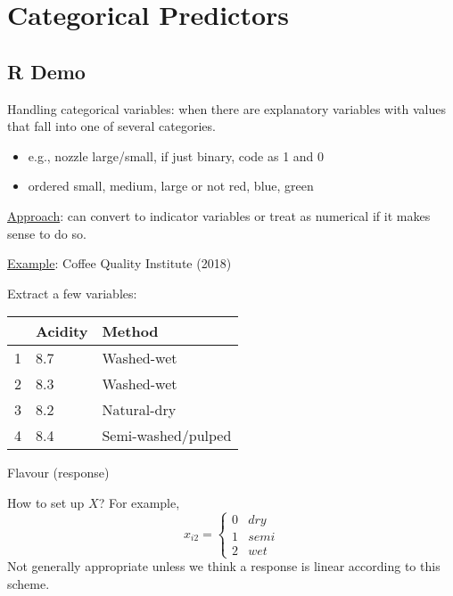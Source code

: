 \section{Categorical Predictors}
\subsection{R Demo}


Handling categorical variables: when there are explanatory
variables with values that fall into one of
several categories.
\begin{itemize}
    \item e.g., nozzle large/small, if just binary,
          code as 1 and 0
    \item ordered small, medium, large or not
          red, blue, green
\end{itemize}
\underline{Approach}: can convert to indicator variables
or treat as numerical if it makes sense to do so.

\underline{Example}: Coffee Quality Institute (2018)

Extract a few variables:
\begin{table}[H]
    \centering
    \begin{tabularx}{0.7\linewidth}{@{}YYY@{}}
          & Acidity & Method             \\
         & 8.7     & Washed-wet         \\
        2 & 8.3     & Washed-wet         \\
        3 & 8.2     & Natural-dry        \\
        4 & 8.4     & Semi-washed/pulped
    \end{tabularx}
\end{table}
Flavour (response)

How to set up $ X $? For example,
\[ x_{i2}=\begin{cases*}
        0 & dry  \\
        1 & semi \\
        2 & wet
    \end{cases*} \]
Not generally appropriate unless we think
a response is linear according to this scheme.

